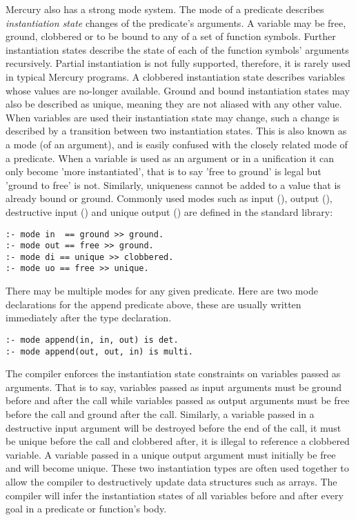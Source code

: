 \noindent
Mercury also has a strong mode system.
The mode of a predicate describes \emph{instantiation state} changes of the
predicate's arguments.
A variable may be free, ground, clobbered or to be bound to any of a set of
function symbols.
Further instantiation states describe the state of each of the function symbols'
arguments recursively.
Partial instantiation is not fully supported,
therefore, it is rarely used in typical Mercury programs.
A clobbered instantiation state describes variables whose values are no-longer
available.
Ground and bound instantiation states may also be described as unique,
meaning they are not aliased with any other value.
When variables are used their instantiation state may change,
such a change is described by a transition between two instantiation states.
This is also known as a mode (of an argument),
and is easily confused with the closely related mode of a predicate.
When a variable is used as an argument or in a unification it can only
become 'more instantiated',
that is to say 'free to ground' is legal but 'ground to free' is not.
Similarly, uniqueness cannot be added to a value that is already
bound or ground.
Commonly used modes such as input (), output (),
destructive input () and unique output () are
defined in the standard library:

\begin{verbatim}
:- mode in  == ground >> ground.
:- mode out == free >> ground.
:- mode di == unique >> clobbered.
:- mode uo == free >> unique.
\end{verbatim}

\noindent
There may be multiple modes for any given predicate.
Here are two mode declarations for the append predicate above,
these are usually written immediately after the type declaration.

\begin{verbatim}
:- mode append(in, in, out) is det.
:- mode append(out, out, in) is multi.
\end{verbatim}

\noindent
The compiler enforces the instantiation state constraints on variables passed
as arguments.
That is to say,
variables passed as input arguments must be ground before and after the call
while variables passed as output arguments must be free before the call and
ground after the call.
Similarly, a variable passed in a destructive input argument will be destroyed
before the end of the call,
it must be unique before the call and clobbered after, it is illegal to
reference a clobbered variable.
A variable passed in a unique output argument must initially be free and
will become unique.
These two instantiation types are often used together to allow the compiler to
destructively update data structures such as arrays.
The compiler will infer the instantiation states of all variables before and
after every goal in a predicate or function's body.

